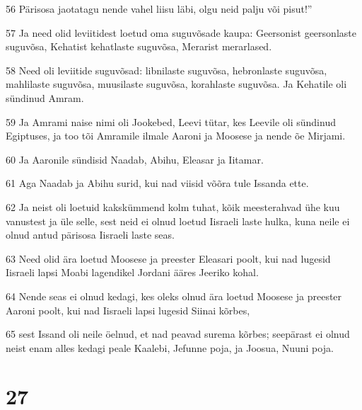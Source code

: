 \par 56 Pärisosa jaotatagu nende vahel liisu läbi, olgu neid palju või pisut!”
\par 57 Ja need olid leviitidest loetud oma suguvõsade kaupa: Geersonist geersonlaste suguvõsa, Kehatist kehatlaste suguvõsa, Merarist merarlased.
\par 58 Need oli leviitide suguvõsad: libnilaste suguvõsa, hebronlaste suguvõsa, mahlilaste suguvõsa, muusilaste suguvõsa, korahlaste suguvõsa. Ja Kehatile oli sündinud Amram.
\par 59 Ja Amrami naise nimi oli Jookebed, Leevi tütar, kes Leevile oli sündinud Egiptuses, ja too tõi Amramile ilmale Aaroni ja Moosese ja nende õe Mirjami.
\par 60 Ja Aaronile sündisid Naadab, Abihu, Eleasar ja Iitamar.
\par 61 Aga Naadab ja Abihu surid, kui nad viisid võõra tule Issanda ette.
\par 62 Ja neist oli loetuid kakskümmend kolm tuhat, kõik meesterahvad ühe kuu vanustest ja üle selle, sest neid ei olnud loetud Iisraeli laste hulka, kuna neile ei olnud antud pärisosa Iisraeli laste seas.
\par 63 Need olid ära loetud Moosese ja preester Eleasari poolt, kui nad lugesid Iisraeli lapsi Moabi lagendikel Jordani ääres Jeeriko kohal.
\par 64 Nende seas ei olnud kedagi, kes oleks olnud ära loetud Moosese ja preester Aaroni poolt, kui nad Iisraeli lapsi lugesid Siinai kõrbes,
\par 65 sest Issand oli neile öelnud, et nad peavad surema kõrbes; seepärast ei olnud neist enam alles kedagi peale Kaalebi, Jefunne poja, ja Joosua, Nuuni poja.

\chapter{27}

